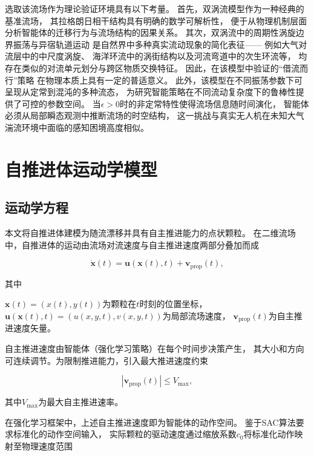 选取该流场作为理论验证环境具有以下考量。
首先，双涡流模型作为一种经典的基准流场，
其拉格朗日相干结构具有明确的数学可解析性，
便于从物理机制层面分析智能体的迁移行为与流场结构的因果关系。
其次，双涡流中的周期性涡旋边界振荡与异宿轨道运动
是自然界中多种真实流动现象的简化表征——
例如大气对流层中的中尺度涡旋、
海洋环流中的涡街结构以及河流弯道中的次生环流等，
均存在类似的对流单元划分与跨区物质交换特征。
因此，在该模型中验证的“借流而行”策略
在物理本质上具有一定的普适意义。
此外，该模型在不同振荡参数下可呈现从定常到混沌的多种流态，
为研究智能策略在不同流动复杂度下的鲁棒性提供了可控的参数空间。
当$\epsilon > 0$时的非定常特性使得流场信息随时间演化，
智能体必须从局部瞬态观测中推断流场的时空结构，
这一挑战与真实无人机在未知大气湍流环境中面临的感知困境高度相似。


\section{自推进体运动学模型}

\subsection{运动学方程}

本文将自推进体建模为随流漂移并具有自主推进能力的点状颗粒。
在二维流场中，自推进体的运动由流场对流速度与自主推进速度两部分叠加而成

\begin{equation}
    \dot{\mathbf{x}}(t) = \mathbf{u}(\mathbf{x}(t), t) + \mathbf{v}_{\text{prop}}(t),
    \label{eq:kinematics}
\end{equation}

其中

$\mathbf{x}(t) = (x(t), y(t))$为颗粒在$t$时刻的位置坐标，
$\mathbf{u}(\mathbf{x}(t), t) = (u(x, y, t), v(x, y, t))$为局部流场速度，
$\mathbf{v}_{\text{prop}}(t)$为自主推进速度矢量。

自主推进速度由智能体（强化学习策略）在每个时间步决策产生，
其大小和方向可连续调节。为限制推进能力，引入最大推进速度约束

\begin{equation}
    |\mathbf{v}_{\text{prop}}(t)| \leq V_{\max},
    \label{eq:speed_constraint}
\end{equation}

其中$V_{\max}$为最大自主推进速率。

在强化学习框架中，上述自主推进速度即为智能体的动作空间。
鉴于SAC算法要求标准化的动作空间输入，
实际颗粒的驱动速度通过缩放系数$c_0$将标准化动作映射至物理速度范围

